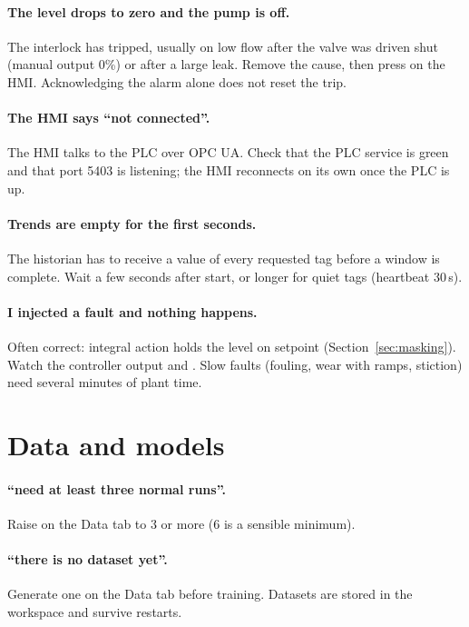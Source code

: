 \paragraph{The level drops to zero and the pump is off.} The interlock has
tripped, usually on low flow after the valve was driven shut (manual output
0\%) or after a large leak. Remove the cause, then press  on the
HMI. Acknowledging the alarm alone does not reset the trip.

\paragraph{The HMI says ``not connected''.} The HMI talks to the PLC over OPC
UA. Check that the PLC service is green and that port 5403 is listening; the
HMI reconnects on its own once the PLC is up.

\paragraph{Trends are empty for the first seconds.} The historian has to
receive a value of every requested tag before a window is complete. Wait a few
seconds after start, or longer for quiet tags (heartbeat 30\,s).

\paragraph{I injected a fault and nothing happens.} Often correct: integral
action holds the level on setpoint (Section~\ref{sec:masking}). Watch the
controller output and . Slow faults (fouling, wear with
ramps, stiction) need several minutes of plant time.

\section{Data and models}

\paragraph{``need at least three normal runs''.} Raise  on
the Data tab to 3 or more (6 is a sensible minimum).

\paragraph{``there is no dataset yet''.} Generate one on the Data tab before
training. Datasets are stored in the workspace and survive restarts.

